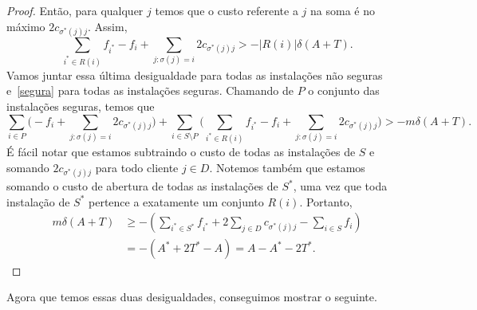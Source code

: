 \begin{proof}
    Então, para qualquer $j$ temos que o custo referente a $j$ na soma é no máximo $2c_{\sigma^*(j)j}$. Assim,
    \[\sum_{i^* \in R(i)}f_{i^*} - f_i + \sum_{j: \sigma(j)= i } 2c_{\sigma^*(j)j} > - |R(i)| \delta(A+T).\]
    Vamos juntar essa última desigualdade para todas as instalações não seguras e~\eqref{segura} para todas as instalações seguras. Chamando de $P$ o conjunto das instalações seguras, temos que
    \[\sum_{i \in P}\Big( - f_i + \sum_{j:\sigma(j) = i} 2c_{\sigma^*(j)j}\Big) + \sum_{i \in S\setminus P}\Big( \sum_{i^* \in R(i)}f_{i^*} - f_i + \sum_{j: \sigma(j)= i } 2c_{\sigma^*(j)j}\Big ) > - m \delta(A+T). \]
    É fácil notar que estamos subtraindo o custo de todas as instalações de $S$ e somando $2c_{\sigma^*(j)j}$ para todo cliente $j\in D$. Notemos também que estamos somando o custo de abertura de todas as instalações de $S^*$, uma vez que toda instalação de $S^*$ pertence a exatamente um conjunto $R(i)$. Portanto,
    \begin{subequations}
        \begin{align*}
            m\delta(A+T) &\geq - (\sum_{i^* \in S^*}f_{i^*} + 2 \sum_{j \in D} c_{\sigma^*(j)j} - \sum_{i \in S} f_i)\\
            & = - ( A^* + 2 T^* - A ) = A - A^* - 2T^* .
        \end{align*}
    \end{subequations}
\end{proof}
Agora que temos essas duas desigualdades, conseguimos mostrar o seguinte.


